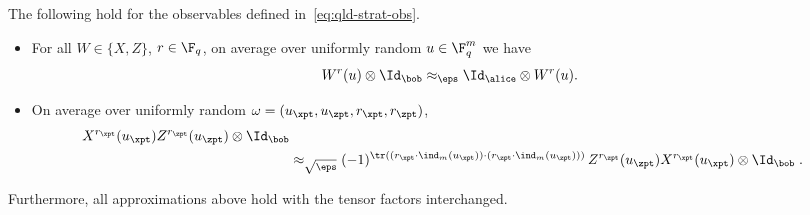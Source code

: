 \begin{lemma}
\label{len:qld-win-implications-obs}The following hold for the observables defined in~\eqref{eq:qld-strat-obs}. 
	\begin{itemize}
		\item For all $W \in \{X,Z\}$, $r \in \F_q$, on average over uniformly random $u \in \F_q^m$ we have
		\begin{equation}
		\label{eq:pts-obs-consistency}
			W^r(u) \otimes \Id_\bob \approx_\eps \Id_\alice \otimes W^r(u).
		\end{equation}
		\item On average over uniformly random $\omega = (u_\xpt,u_\zpt,r_\xpt,r_\zpt)$, 
		\begin{align}
			X^{r_\xpt}(u_\xpt)
                        Z^{r_\zpt}(u_\zpt) \otimes \Id_\bob\notag\\
												&       \approx_{\sqrt{\eps}} (-1)^{\tr ((r_\xpt \cdot
                          \ind_m(u_\xpt)) \cdot (r_\zpt \cdot \ind_m(u_\zpt)))} \, Z^{r_\zpt}(u_\zpt) X^{r_\xpt}(u_\xpt) \otimes \Id_\bob	\;.	\label{eq:pts-obs-commutation}
		\end{align}
	\end{itemize}
	Furthermore, all approximations above hold with the tensor factors interchanged.
\end{lemma}

